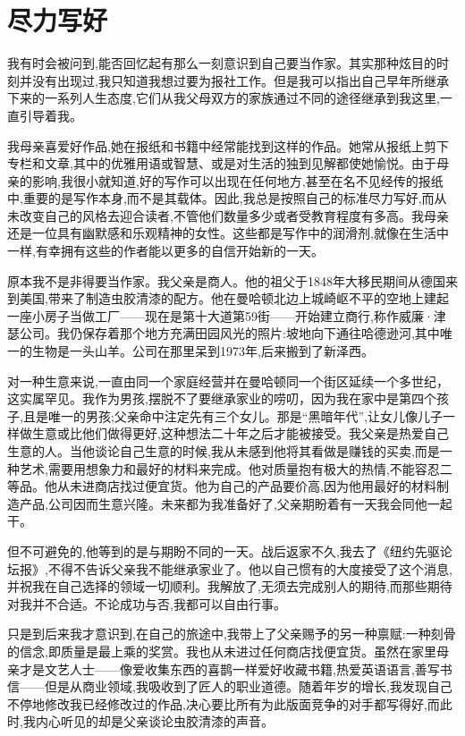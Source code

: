 \chapter{尽力写好}
我有时会被问到,能否回忆起有那么一刻意识到自己要当作家。其实那种炫目的时刻并没有出现过,我只知道我想过要为报社工作。但是我可以指出自己早年所继承下来的一系列人生态度,它们从我父母双方的家族通过不同的途径继承到我这里,一直引导着我。

我母亲喜爱好作品,她在报纸和书籍中经常能找到这样的作品。她常从报纸上剪下专栏和文章,其中的优雅用语或智慧、或是对生活的独到见解都使她愉悦。由于母亲的影响,我很小就知道,好的写作可以出现在任何地方,甚至在名不见经传的报纸中,重要的是写作本身,而不是其载体。因此,我总是按照自己的标准尽力写好,而从未改变自己的风格去迎合读者,不管他们数量多少或者受教育程度有多高。我母亲还是一位具有幽默感和乐观精神的女性。这些都是写作中的润滑剂,就像在生活中一样,有幸拥有这些的作者能以更多的自信开始新的一天。

原本我不是非得要当作家。我父亲是商人。他的祖父于1848年大移民期间从德国来到美国,带来了制造虫胶清漆的配方。他在曼哈顿北边上城崎岖不平的空地上建起一座小房子当做工厂——现在是第十大道第59街——开始建立商行,称作威廉·津瑟公司。我仍保存着那个地方充满田园风光的照片:坡地向下通往哈德逊河,其中唯一的生物是一头山羊。公司在那里呆到1973年,后来搬到了新泽西。

对一种生意来说,一直由同一个家庭经营并在曼哈顿同一个街区延续一个多世纪，这实属罕见。我作为男孩,摆脱不了要继承家业的唠叨，因为我在家中是第四个孩子,且是唯一的男孩;父亲命中注定先有三个女儿。那是“黑暗年代”,让女儿像儿子一样做生意或比他们做得更好,这种想法二十年之后才能被接受。我父亲是热爱自己生意的人。当他谈论自己生意的时候,我从未感到他将其看做是赚钱的买卖,而是一种艺术,需要用想象力和最好的材料来完成。他对质量抱有极大的热情,不能容忍二等品。他从未进商店找过便宜货。他为自己的产品要价高,因为他用最好的材料制造产品,公司因而生意兴隆。未来都为我准备好了,父亲期盼着有一天我会同他一起干。

但不可避免的,他等到的是与期盼不同的一天。战后返家不久,我去了《纽约先驱论坛报》,不得不告诉父亲我不能继承家业了。他以自己惯有的大度接受了这个消息,并祝我在自己选择的领域一切顺利。我解放了,无须去完成别人的期待,而那些期待对我并不合适。不论成功与否,我都可以自由行事。

只是到后来我才意识到,在自己的旅途中,我带上了父亲赐予的另一种禀赋:一种刻骨的信念,即质量是最上乘的奖赏。我也从未进过任何商店找便宜货。虽然在家里母亲才是文艺人士——像爱收集东西的喜鹊一样爱好收藏书籍,热爱英语语言,善写书信——但是从商业领域,我吸收到了匠人的职业道德。随着年岁的增长,我发现自己不停地修改我已经修改过的作品,决心要比所有为此版面竞争的对手都写得好,而此时,我内心听见的却是父亲谈论虫胶清漆的声音。

